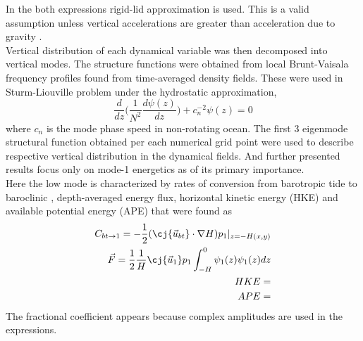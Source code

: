 \documentclass[12pt]{article}
\begin{document}
In the both expressions rigid-lid approximation is used. This is a valid assumption unless 
vertical accelerations are greater than acceleration due to gravity \citep{kelly2010}.\\
Vertical distribution of each dynamical variable was then decomposed into vertical modes. The 
structure functions were 
obtained from local Brunt-Vaisala frequency profiles found from time-averaged density fields. 
These were used in Sturm-Liouville problem under the hydrostatic approximation,
\begin{equation}
\frac{d}{dz}\Big( \frac{1}{N^2}  \frac{d \psi(z)}{dz}\Big) + c^{-2}_n \psi(z) 
= 0
\end{equation}
where $c_n$ is the mode phase speed in non-rotating ocean. The first 3 eigenmode structural 
function obtained per each numerical grid point were used to describe respective vertical 
distribution in the dynamical fields. And further presented results focus only on mode-1 energetics 
as of its primary importance.\\
Here the low mode is characterized by rates of conversion from barotropic tide to baroclinic 
\citep{simmons2004internal, kurapov2003m}, depth-averaged energy flux, horizontal kinetic energy 
(HKE) and available potential energy (APE) that were found as
\begin{align}
\label{C3.eq:conv}
C_{bt\to 1} = -\frac{1}{2}(\cj{\vec{u}_{bt}} \cdot \nabla H) p_{1}|_{z = -H(x,y)}\\
\vec{F} = \frac{1}{2} \frac{1}{H} \cj{\vec{u}_1} p_1 \int_{-H}^{0} \psi_1(z) \psi_1(z) dz\\
HKE = \\
APE = 
\end{align}
The fractional coefficient appears because complex amplitudes are used in the expressions.\\
\end{document}
